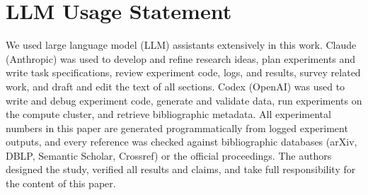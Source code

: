 \section*{LLM Usage Statement}
We used large language model (LLM) assistants extensively in this work.
Claude (Anthropic) was used to develop and refine research ideas, plan experiments and write task specifications, review experiment code, logs, and results, survey related work, and draft and edit the text of all sections.
Codex (OpenAI) was used to write and debug experiment code, generate and validate data, run experiments on the compute cluster, and retrieve bibliographic metadata.
All experimental numbers in this paper are generated programmatically from logged experiment outputs, and every reference was checked against bibliographic databases (arXiv, DBLP, Semantic Scholar, Crossref) or the official proceedings.
The authors designed the study, verified all results and claims, and take full responsibility for the content of this paper.
